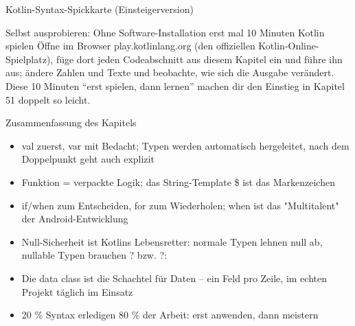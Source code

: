 \begin{center}\small\color{gray}Kotlin-Syntax-Spickkarte (Einsteigerversion)\end{center}

\begin{tcbpractice}{Selbst ausprobieren: Ohne Software-Installation erst mal 10 Minuten Kotlin spielen}
Öffne im Browser play.kotlinlang.org (den offiziellen Kotlin-Online-Spielplatz), füge dort jeden Codeabschnitt aus diesem Kapitel ein und führe ihn aus; ändere Zahlen und Texte und beobachte, wie sich die Ausgabe verändert. Diese 10 Minuten “erst spielen, dann lernen” machen dir den Einstieg in Kapitel 51 doppelt so leicht.

\end{tcbpractice}

\begin{tcbsummary}{Zusammenfassung des Kapitels}
\begin{itemize}
  \item val zuerst, var mit Bedacht; Typen werden automatisch hergeleitet, nach dem Doppelpunkt geht auch explizit
  \item Funktion = verpackte Logik; das String-Template \$ ist das Markenzeichen
  \item if/when zum Entscheiden, for zum Wiederholen; when ist das "Multitalent" der Android-Entwicklung
  \item Null-Sicherheit ist Kotlins Lebensretter: normale Typen lehnen null ab, nullable Typen brauchen ? bzw. ?:
  \item Die data class ist die Schachtel für Daten – ein Feld pro Zeile, im echten Projekt täglich im Einsatz
  \item 20 \% Syntax erledigen 80 \% der Arbeit: erst anwenden, dann meistern
\end{itemize}

\end{tcbsummary}
